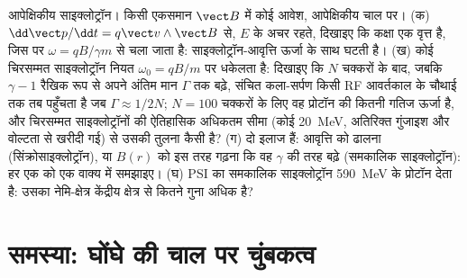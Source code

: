 \begin{exercise}[$\star\star\star$]\label{exo:b3:covariant-electromagnetism:12}
आपेक्षिकीय साइक्लोट्रॉन। किसी एकसमान $\vect B$ में कोई आवेश,
आपेक्षिकीय चाल पर। (क) $\dd\vect p/\dd t = q\vect v\wedge\vect
B$ से, $E$ के अचर रहते, दिखाइए कि कक्षा एक वृत्त है, जिस पर
$\omega = qB/\gamma m$ से चला जाता है: साइक्लोट्रॉन-आवृत्ति ऊर्जा के
साथ घटती है।
(ख) कोई चिरसम्मत साइक्लोट्रॉन नियत $\omega_0 = qB/m$ पर धकेलता है:
दिखाइए कि $N$ चक्करों के बाद, जबकि $\gamma - 1$ रैखिक रूप से अपने
अंतिम मान $\Gamma$ तक बढ़े, संचित कला-सर्पण किसी RF आवर्तकाल के चौथाई
तक तब पहुँचता है जब $\Gamma \approx 1/2N$; $N = 100$ चक्करों के लिए वह
प्रोटॉन की कितनी गतिज ऊर्जा है, और चिरसम्मत साइक्लोट्रॉनों की
ऐतिहासिक अधिकतम सीमा (कोई \qty{20}{MeV}, अतिरिक्त गुंजाइश और वोल्टता
से खरीदी गई) से उसकी तुलना कैसी है? (ग) दो
इलाज हैं: आवृत्ति को ढालना (सिंक्रोसाइक्लोट्रॉन), या $B(r)$ को इस तरह
गढ़ना कि वह $\gamma$ की तरह बढ़े (समकालिक साइक्लोट्रॉन): हर एक को एक
वाक्य में समझाइए। (घ) PSI का समकालिक साइक्लोट्रॉन \qty{590}{MeV} के
प्रोटॉन देता है: उसका नेमि-क्षेत्र केंद्रीय क्षेत्र से कितने गुना
अधिक है?
\end{exercise}

\section{समस्या: घोंघे की चाल पर चुंबकत्व}


